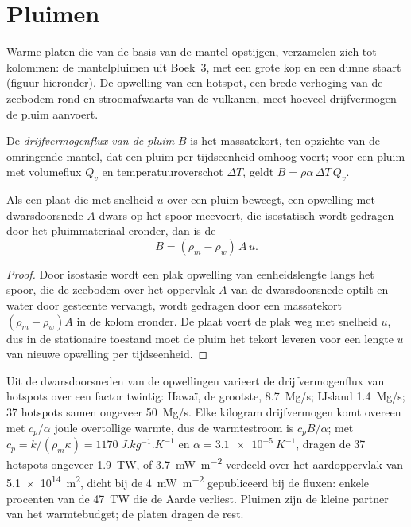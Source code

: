 \section{Pluimen}

Warme platen die van de basis van de mantel opstijgen, verzamelen zich tot kolommen:
de mantelpluimen uit Boek~3, met een grote kop en een dunne staart (figuur hieronder).
De opwelling van een hotspot, een brede verhoging van de zeebodem rond en stroomafwaarts van
de vulkanen, meet hoeveel drijfvermogen de pluim aanvoert.

\begin{definition}\label{def:b3:mantle-convection:buoyancy-flux}
De \emph{drijfvermogenflux van de pluim} $B$ is het massatekort,
ten opzichte van de omringende mantel, dat een pluim per
tijdseenheid omhoog voert; voor een pluim met volumeflux $Q_v$ en temperatuuroverschot $\Delta T$,
geldt $B = \rho\alpha\,\Delta T\,Q_v$.
\end{definition}

\begin{proposition}\label{prop:b3:mantle-convection:swell}
Als een plaat die met snelheid $u$ over een pluim beweegt, een opwelling met
dwarsdoorsnede $A$ dwars op het spoor meevoert, die isostatisch wordt gedragen door het
pluimmateriaal eronder, dan is de 
\[
  B = (\rho_m - \rho_w)\,A\,u .
\]
\end{proposition}

\begin{proof}
Door isostasie wordt een plak opwelling van eenheidslengte langs het spoor, die de zeebodem
over het oppervlak $A$ van de dwarsdoorsnede optilt en water door gesteente vervangt,
wordt gedragen door een massatekort $(\rho_m - \rho_w)A$ in de kolom eronder.
De plaat voert de plak weg met snelheid $u$, dus in de stationaire toestand moet de
pluim het tekort leveren voor een lengte $u$ van nieuwe opwelling per tijdseenheid.
\end{proof}

Uit de dwarsdoorsneden van de opwellingen varieert de drijfvermogenflux van hotspots over
een factor twintig: Hawaï, de grootste, \qty{8.7}{Mg/s}; IJsland
\qty{1.4}{Mg/s}; 37 hotspots samen ongeveer \qty{50}{Mg/s}. Elke kilogram
drijfvermogen komt overeen met $c_p/\alpha$ joule overtollige warmte, dus de warmtestroom is $c_pB/\alpha$;
met $c_p = k/(\rho_m\kappa) = \qty{1170}{J.kg^{-1}.K^{-1}}$ en $\alpha =
\qty{3.1e-5}{K^{-1}}$, dragen de 37 hotspots ongeveer \qty{1.9}{TW}, of
\qty{3.7}{mW.m^{-2}} verdeeld over het aardoppervlak van \qty{5.1e14}{m^2}, dicht bij de
\qty{4}{mW.m^{-2}} gepubliceerd bij de fluxen: enkele procenten van de
\qty{47}{TW} die de Aarde verliest. Pluimen zijn de kleine partner van het
warmtebudget; de platen dragen de rest.

